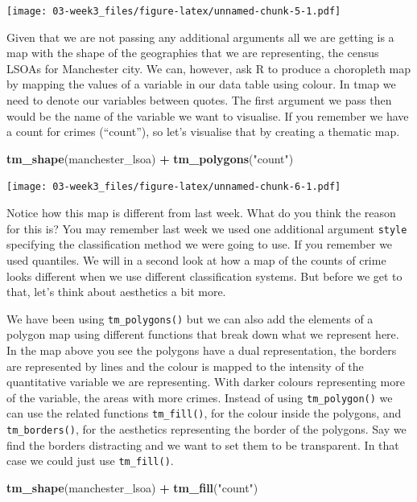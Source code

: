 \documentclass[]{book}
\newenvironment{Shaded}{\begin{snugshade}}{\end{snugshade}}
\newcommand{\KeywordTok}[1]{\textcolor[rgb]{0.13,0.29,0.53}{\textbf{#1}}}
\newcommand{\NormalTok}[1]{#1}
\newcommand{\OperatorTok}[1]{\textcolor[rgb]{0.81,0.36,0.00}{\textbf{#1}}}
\newcommand{\StringTok}[1]{\textcolor[rgb]{0.31,0.60,0.02}{#1}}
\begin{document}
\texttt{[image: 03-week3\_files/figure-latex/unnamed-chunk-5-1.pdf]}

Given that we are not passing any additional arguments all we are getting is a map with the shape of the geographies that we are representing, the census LSOAs for Manchester city. We can, however, ask R to produce a choropleth map by mapping the values of a variable in our data table using colour. In tmap we need to denote our variables between quotes. The first argument we pass then would be the name of the variable we want to visualise. If you remember we have a count for crimes (``count''), so let's visualise that by creating a thematic map.

\begin{Shaded}
\begin{Highlighting}[]
\KeywordTok{tm_shape}\NormalTok{(manchester_lsoa) }\OperatorTok{+}\StringTok{ }
\StringTok{  }\KeywordTok{tm_polygons}\NormalTok{(}\StringTok{"count"}\NormalTok{)}
\end{Highlighting}
\end{Shaded}

\texttt{[image: 03-week3\_files/figure-latex/unnamed-chunk-6-1.pdf]}

Notice how this map is different from last week. What do you think the reason for this is? You may remember last week we used one additional argument \texttt{style} specifying the classification method we were going to use. If you remember we used quantiles. We will in a second look at how a map of the counts of crime looks different when we use different classification systems. But before we get to that, let's think about aesthetics a bit more.

We have been using \texttt{tm\_polygons()} but we can also add the elements of a polygon map using different functions that break down what we represent here. In the map above you see the polygons have a dual representation, the borders are represented by lines and the colour is mapped to the intensity of the quantitative variable we are representing. With darker colours representing more of the variable, the areas with more crimes. Instead of using \texttt{tm\_polygon()} we can use the related functions \texttt{tm\_fill()}, for the colour inside the polygons, and \texttt{tm\_borders()}, for the aesthetics representing the border of the polygons. Say we find the borders distracting and we want to set them to be transparent. In that case we could just use \texttt{tm\_fill()}.

\begin{Shaded}
\begin{Highlighting}[]
\KeywordTok{tm_shape}\NormalTok{(manchester_lsoa) }\OperatorTok{+}\StringTok{ }
\StringTok{  }\KeywordTok{tm_fill}\NormalTok{(}\StringTok{"count"}\NormalTok{)}
\end{Highlighting}
\end{Shaded}
\end{document}
